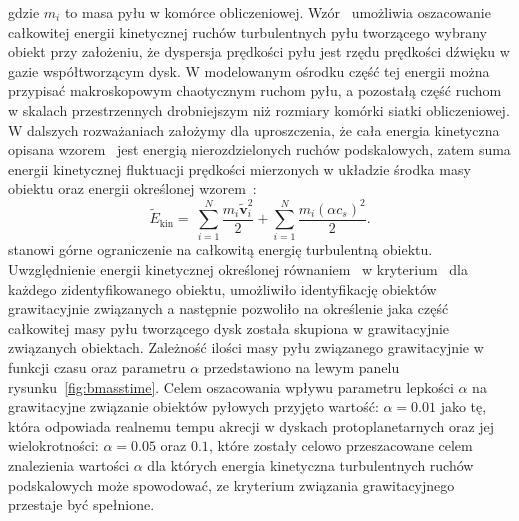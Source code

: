 gdzie $m_i$ to masa pyłu w komórce obliczeniowej. 
Wzór~ umożliwia oszacowanie całkowitej energii kinetycznej ruchów
turbulentnych pyłu tworzącego wybrany obiekt przy założeniu, że dyspersja
prędkości pyłu jest rzędu prędkości dźwięku w gazie współtworzącym dysk. W
modelowanym ośrodku część tej energii można przypisać makroskopowym chaotycznym
ruchom pyłu, a pozostałą część ruchom w skalach przestrzennych drobniejszym niż
rozmiary komórki siatki obliczeniowej. W dalszych rozważaniach założymy dla
uproszczenia, że cała energia kinetyczna opisana wzorem~ jest energią
nierozdzielonych ruchów podskalowych, zatem suma energii kinetycznej fluktuacji
prędkości mierzonych w układzie środka masy obiektu oraz energii określonej
wzorem~:
%
\begin{equation}
   \label{eq:ekin}
   \tilde{E}_{\textrm{kin}} = \
   \sum\limits_{i=1}^N \frac{m_i\tilde{\mathbf{v}}_i^2}{2}
   + \sum\limits_{i=1}^N \frac{m_i \left(\alpha c_s\right)^2}{2}.
\end{equation}
%
stanowi górne ograniczenie na całkowitą energię turbulentną obiektu.
Uwzględnienie energii kinetycznej określonej równaniem~\mref{eq:ekin} w
kryterium~\mref{eq:bcrit} dla każdego zidentyfikowanego obiektu, umożliwiło
identyfikację obiektów grawitacyjnie związanych a następnie pozwoliło na
określenie jaka część całkowitej masy pyłu tworzącego dysk
została skupiona w grawitacyjnie związanych
obiektach. Zależność ilości masy pyłu związanego grawitacyjnie w funkcji czasu
oraz parametru $\alpha$ przedstawiono na lewym panelu
rysunku~\ref{fig:bmasstime}. Celem oszacowania wpływu parametru lepkości
$\alpha$ na grawitacyjne związanie obiektów pyłowych przyjęto wartość:
$\alpha=0.01$ jako tę, która odpowiada realnemu tempu akrecji w dyskach
protoplanetarnych oraz jej wielokrotności: $\alpha=0.05$ oraz $0.1$, które
zostały celowo przeszacowane celem znalezienia wartości $\alpha$ dla których
energia kinetyczna turbulentnych ruchów podskalowych może spowodować, ze
kryterium związania grawitacyjnego przestaje być spełnione.
%
